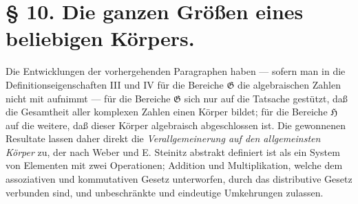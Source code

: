 \section*{§ 10. Die ganzen Größen eines beliebigen Körpers.}

Die Entwicklungen der vorhergehenden Paragraphen haben --- sofern man in die
Definitionseigenschaften III und IV für die Bereiche $\mathfrak G$ die
algebraischen Zahlen nicht mit aufnimmt --- für die Bereiche $\mathfrak G$ sich
nur auf die Tatsache gestützt, daß die Gesamtheit aller komplexen Zahlen einen
Körper bildet; für die Bereiche $\mathfrak H$ auf
die weitere, daß dieser Körper algebraisch abgeschlossen ist. Die gewonnenen
Resultate lassen daher direkt die \emph{Verallgemeinerung auf den allgemeinsten
Körper} zu, der nach Weber und E. Steinitz
abstrakt definiert ist als \glqq{}ein System von Elementen mit zwei Operationen;
Addition und Multiplikation, welche dem assoziativen und kommutativen Gesetz
unterworfen, durch das distributive Gesetz verbunden sind, und unbeschränkte und
eindeutige Umkehrungen zulassen.\grqq{}

